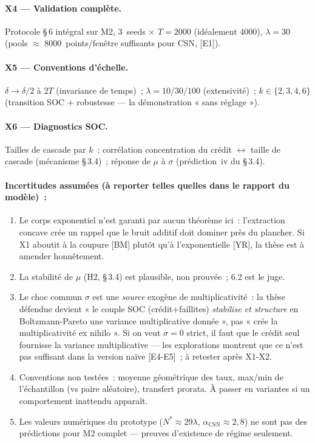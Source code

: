 \documentclass[11pt,a4paper]{article}
\begin{document}
\paragraph{X4 --- Validation complète.} Protocole \S\,6 intégral sur M2, 3~seeds $\times$ $T=2000$ (idéalement 4000), $\lambda=30$ (pools $\approx$ 8000~points/fenêtre suffisants pour CSN, [E1]).

\paragraph{X5 --- Conventions d'échelle.} $\delta\to\delta/2$ à $2T$ (invariance de temps)~; $\lambda=10/30/100$ (extensivité)~; $k\in\{2,3,4,6\}$ (transition SOC + robustesse --- la démonstration « sans réglage »).

\paragraph{X6 --- Diagnostics SOC.} Tailles de cascade par $k$~; corrélation concentration du crédit $\leftrightarrow$ taille de cascade (mécanisme \S\,3.4)~; réponse de $\mu$ à $\sigma$ (prédiction~iv du \S\,3.4).

\paragraph{Incertitudes assumées (à reporter telles quelles dans le rapport du modèle)~:}
\begin{enumerate}
  \item Le corps exponentiel n'est garanti par aucun théorème ici~: l'extraction concave crée un rappel que le bruit additif doit dominer près du plancher. Si X1 aboutit à la coupure [BM] plutôt qu'à l'exponentielle [YR], la thèse est à amender honnêtement.
  \item La stabilité de $\mu$ (H2, \S\,3.4) est plausible, non prouvée~; 6.2 est le juge.
  \item Le choc commun $\sigma$ est une \emph{source} exogène de multiplicativité~: la thèse défendue devient « le couple SOC (crédit+faillites) \emph{stabilise et structure} en Boltzmann-Pareto une variance multiplicative donnée », pas « crée la multiplicativité ex nihilo ». Si on veut $\sigma=0$ strict, il faut que le crédit seul fournisse la variance multiplicative --- les explorations montrent que ce n'est pas suffisant dans la version naïve [E4-E5]~; à retester après X1-X2.
  \item Conventions non testées~: moyenne géométrique des taux, max/min de l'échantillon (vs paire aléatoire), transfert prorata. À passer en variantes si un comportement inattendu apparaît.
  \item Les valeurs numériques du prototype ($N^*\approx 29\lambda$, $\alpha_{\mathrm{CSN}}\approx 2{,}8$) ne sont pas des prédictions pour M2 complet --- preuves d'existence de régime seulement.
\end{enumerate}
\end{document}
